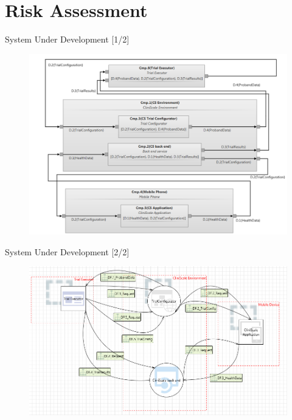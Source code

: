 \documentclass[xcolor=table]{beamer}
\begin{document}
\section{Risk Assessment}
\begin{frame}{System Under Development [1/2]}
 \begin{figure}[H]
  \includegraphics[width=0.9\linewidth]{img/sud_cs.png}
  \label{fig:sud_cs}
 \end{figure}
\end{frame}


\begin{frame}{System Under Development [2/2]}
 \begin{figure}[H]
  \includegraphics[width=\linewidth]{img/mtmt_model.PNG}
  \label{fig:mtmt_model}
 \end{figure}
\end{frame}
\end{document}
